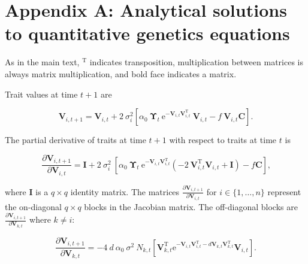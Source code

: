 \section*{Appendix A: Analytical solutions to quantitative genetics equations}



As in the main text, $^{\text{T}}$ indicates transposition,
multiplication between matrices is always matrix multiplication, and
bold face indicates a matrix.


Trait values at time $t+1$ are

\begin{equation} \label{eq:trait-change-full}
    \mathbf{V}_{i,t+1} = \mathbf{V}_{i,t} + 2 ~ \sigma_i^2
    \left[
        \alpha_0 ~ \mathbf{\Upsilon}_t ~
            \text{e}^{-\mathbf{V}_{i,t} \mathbf{V}_{i,t}^\text{T}} ~ \mathbf{V}_{i,t}
        - f ~ \mathbf{V}_{i,t} \mathbf{C}
    \right]
    \text{.}
\end{equation}

The partial derivative of traits at time $t+1$ with respect to traits at time $t$ is

\begin{equation} \label{eq:deriv-traits-i}
    \frac{ \partial \mathbf{V}_{i,t+1} }{ \partial \mathbf{V}_{i,t} } = \mathbf{I} + 2 ~ \sigma_i^2 ~
        \left[
            \alpha_0 ~ \mathbf{\Upsilon}_t ~ \text{e}^{ - \mathbf{V}_{i,t} \mathbf{V}_{i,t}^{\text{T}} }
            \left(
                -2 ~ \mathbf{V}_{i,t}^{\text{T}} \mathbf{V}_{i,t} + \mathbf{I}
            \right) -
            f \mathbf{C}
        \right]
    \text{,}
\end{equation}

where $\mathbf{I}$ is a $q \times q$ identity matrix.
The matrices $\frac{ \partial \mathbf{V}_{i,t+1} }{ \partial \mathbf{V}_{i,t} }$ for $i \in \{1, \ldots, n\}$ represent the on-diagonal $q \times q$ blocks in the Jacobian matrix.
The off-diagonal blocks are $\frac{ \partial \mathbf{V}_{i,t+1} }{ \partial \mathbf{V}_{k,t} }$ where $k \ne i$:

\begin{equation} \label{eq:deriv-traits-k}
    \frac{ \partial\mathbf{V}_{i,t+1} }{ \partial\mathbf{V}_{k,t}} =
        -4 ~ d ~ \alpha_0 ~ \sigma^2 ~ N_{k,t}
        \left[
            \mathbf{V}_{k,t}^{\text{T}}
            \text{e}^{
                - \mathbf{V}_{i,t} \mathbf{V}_{i,t}^{\text{T}}
                - d \mathbf{V}_{k,t} \mathbf{V}_{k,t}^{\text{T}}
            }
            \mathbf{V}_{i,t}
        \right]
    \text{.}
\end{equation}




